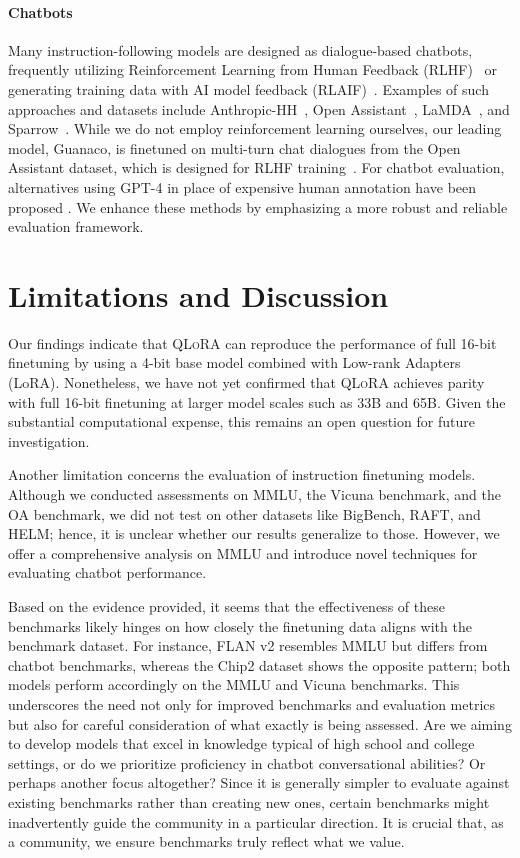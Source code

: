 \paragraph{Chatbots} Many instruction-following models are designed as dialogue-based chatbots, frequently utilizing Reinforcement Learning from Human Feedback (RLHF)~\citep{christiano2017deep} or generating training data with AI model feedback (RLAIF)~\citep{bai2022constitutional}. Examples of such approaches and datasets include Anthropic-HH~\citep{askell2021general,bai2022training}, Open Assistant~\citep{kopf2023openassistant}, LaMDA~\citep{thoppilan2022lamda}, and Sparrow~\citep{glaese2022improving}. While we do not employ reinforcement learning ourselves, our leading model, Guanaco, is finetuned on multi-turn chat dialogues from the Open Assistant dataset, which is designed for RLHF training~\citep{kopf2023openassistant}. For chatbot evaluation, alternatives using GPT-4 in place of expensive human annotation have been proposed \citep{vicuna2023,peng2023instruction}. We enhance these methods by emphasizing a more robust and reliable evaluation framework.

\section{Limitations and Discussion}

Our findings indicate that \textsc{QLoRA} can reproduce the performance of full 16-bit finetuning by using a 4-bit base model combined with Low-rank Adapters (LoRA). Nonetheless, we have not yet confirmed that \textsc{QLoRA} achieves parity with full 16-bit finetuning at larger model scales such as 33B and 65B. Given the substantial computational expense, this remains an open question for future investigation.

Another limitation concerns the evaluation of instruction finetuning models. Although we conducted assessments on MMLU, the Vicuna benchmark, and the OA benchmark, we did not test on other datasets like BigBench, RAFT, and HELM; hence, it is unclear whether our results generalize to those. However, we offer a comprehensive analysis on MMLU and introduce novel techniques for evaluating chatbot performance.

Based on the evidence provided, it seems that the effectiveness of these benchmarks likely hinges on how closely the finetuning data aligns with the benchmark dataset. For instance, FLAN v2 resembles MMLU but differs from chatbot benchmarks, whereas the Chip2 dataset shows the opposite pattern; both models perform accordingly on the MMLU and Vicuna benchmarks. This underscores the need not only for improved benchmarks and evaluation metrics but also for careful consideration of what exactly is being assessed. Are we aiming to develop models that excel in knowledge typical of high school and college settings, or do we prioritize proficiency in chatbot conversational abilities? Or perhaps another focus altogether? Since it is generally simpler to evaluate against existing benchmarks rather than creating new ones, certain benchmarks might inadvertently guide the community in a particular direction. It is crucial that, as a community, we ensure benchmarks truly reflect what we value.

